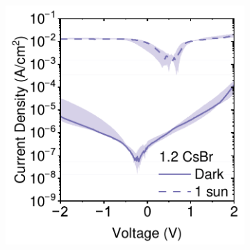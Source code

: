 \begin{figure}[htbp]
\begin{subfigure}[b]{0.3\textwidth}
        \caption{}
    \end{subfigure}
    \hfill
    \begin{subfigure}[b]{0.3\textwidth}
        \centering
        \includegraphics[width=\textwidth]{chapters/material_properties/images/12CsBr.pdf}
        \caption{}
    \end{subfigure}

    \vspace{1em} %


\end{figure}
